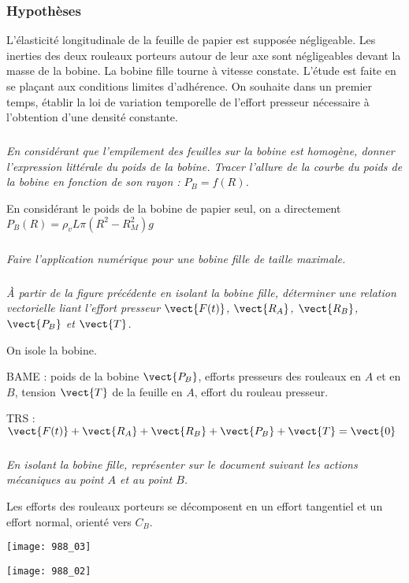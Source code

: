\subsubsection*{Hypothèses}

L'élasticité longitudinale de la feuille de papier est supposée négligeable.
Les inerties des deux rouleaux porteurs autour de leur axe sont négligeables devant la masse de la bobine. La bobine fille tourne à vitesse constate. L'étude est faite en se plaçant aux conditions limites d'adhérence.
On souhaite dans un premier temps, établir la loi de variation temporelle de l'effort presseur nécessaire à l'obtention d'une densité constante.


\subparagraph{}
\textit{En considérant que l'empilement des feuilles sur la bobine est homogène, donner l'expression littérale du poids de la bobine. Tracer l'allure de la courbe du poids de la bobine en fonction de son rayon : $P_B = f(R)$.}
\ifprof
\begin{corrige} En considérant le poids de la bobine de papier seul, on a directement 
$P_B (R)= \rho_v L \pi \left(R^2 - R_M^2 \right) g$
\end{corrige}
\else
\fi

\subparagraph{}
\textit{Faire l'application numérique pour une bobine fille de taille maximale.}
\ifprof
\begin{corrige}
\end{corrige}
\else
\fi

\subparagraph{}
\textit{À partir de la figure précédente en isolant la bobine fille, déterminer une relation vectorielle liant l'effort presseur 
$\vect{F(t)}$, $\vect{R_A}$, $\vect{R_B}$, $\vect{P_B}$ et $\vect{T}$. }
\ifprof
\begin{corrige}
On isole la bobine.

BAME : poids de la bobine $\vect{P_B}$, efforts presseurs des rouleaux en $A$ et en $B$, tension $\vect{T}$ de la feuille en $A$, effort du rouleau presseur.

TRS : $\vect{F(t)} + \vect{R_A} + \vect{R_B} + \vect{P_B} + \vect{T} = \vect{0}$
\end{corrige}
\else
\fi


\subparagraph{}
\textit{En isolant la bobine fille, représenter sur le document suivant les actions mécaniques au point $A$ et au point $B$.}
\ifprof
\begin{corrige}
Les efforts des rouleaux porteurs se décomposent en un effort tangentiel et un effort normal, orienté vers $C_B$.


\begin{center}
\texttt{[image: 988\_03]}%
\end{center}

\end{corrige}
\else
\begin{center}
\texttt{[image: 988\_02]}%
\end{center}
\fi



